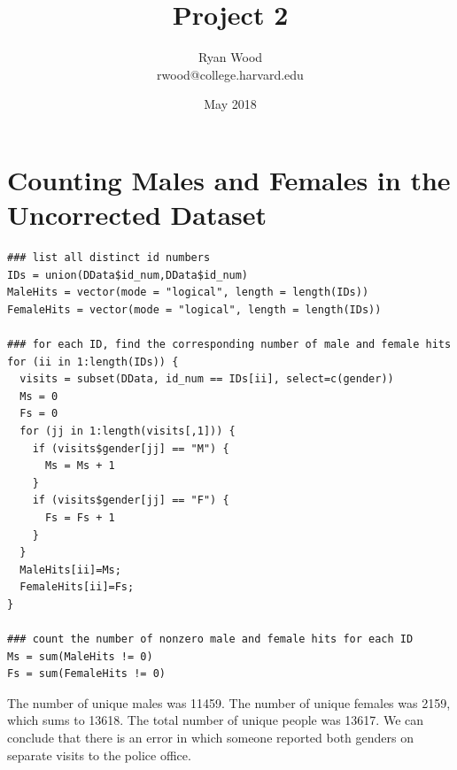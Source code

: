 \documentclass{article}
\title{Project 2}
\author{Ryan Wood\\
rwood@college.harvard.edu}
\date{May 2018}
\begin{document}
\maketitle

\section{Counting Males and Females in the Uncorrected Dataset}
\begin{verbatim}
### list all distinct id numbers
IDs = union(DData$id_num,DData$id_num)
MaleHits = vector(mode = "logical", length = length(IDs))
FemaleHits = vector(mode = "logical", length = length(IDs))

### for each ID, find the corresponding number of male and female hits
for (ii in 1:length(IDs)) {
  visits = subset(DData, id_num == IDs[ii], select=c(gender))
  Ms = 0
  Fs = 0
  for (jj in 1:length(visits[,1])) {
    if (visits$gender[jj] == "M") {
      Ms = Ms + 1
    }
    if (visits$gender[jj] == "F") {
      Fs = Fs + 1
    }
  }
  MaleHits[ii]=Ms;
  FemaleHits[ii]=Fs;
}

### count the number of nonzero male and female hits for each ID
Ms = sum(MaleHits != 0)
Fs = sum(FemaleHits != 0)
\end{verbatim}
The number of unique males was 11459. The number of unique females was 2159, which sums to 13618. The total number of unique people was 13617. We can conclude that there is an error in which someone reported both genders on separate visits to the police office.\\
\end{document}
